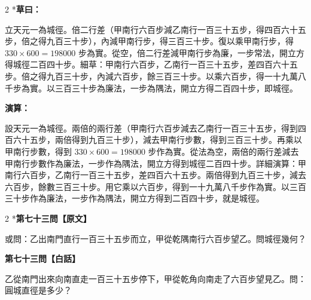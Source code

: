 \documentclass[11pt,a4paper]{article}
\begin{document}
\begin{paracol}{2}
\switchcolumn[0]*\textbf{草曰：}

\small 立天元一為城徑。倍二行差（甲南行六百步減乙南行一百三十五步，得四百六十五步，倍之得九百三十步），內減甲南行步，得三百三十步。復以乘甲南行步，得 $330 \times 600 = 198000$ 步為實。從空，倍二行差減甲南行步為廉，一步常法，開立方得城徑二百四十步。細草：甲南行六百步，乙南行一百三十五步，差四百六十五步。倍之得九百三十步，內減六百步，餘三百三十步。以乘六百步，得一十九萬八千步為實。以三百三十步為廉法，一步為隅法，開立方得二百四十步，即城徑。

\switchcolumn\textbf{演算：}

\small 設天元一為城徑。兩倍的兩行差（甲南行六百步減去乙南行一百三十五步，得到四百六十五步，兩倍得到九百三十步），減去甲南行步數，得到三百三十步。再乘以甲南行步數，得到 $330 \times 600 = 198000$ 步作為實。從法為空，兩倍的兩行差減去甲南行步數作為廉法，一步作為隅法，開立方得到城徑二百四十步。詳細演算：甲南行六百步，乙南行一百三十五步，差四百六十五步。兩倍得到九百三十步，減去六百步，餘數三百三十步。用它乘以六百步，得到一十九萬八千步作為實。以三百三十步作為廉法，一步作為隅法，開立方得到二百四十步，就是城徑。
\end{paracol}

\vspace{0.1cm}
\noindent{}
\par\vspace{0.3cm}

\begin{paracol}{2}
\switchcolumn[0]*\noindent\textbf{第七十三問【原文】}

\small 或問：乙出南門直行一百三十五步而立，甲從乾隅南行六百步望乙。問城徑幾何？

\switchcolumn\noindent\textbf{第七十三問【白話】}

\small 乙從南門出來向南直走一百三十五步停下，甲從乾角向南走了六百步望見乙。問：圓城直徑是多少？
\end{paracol}

\vspace{0.1cm}
\noindent{}
\par\vspace{0.15cm}
\end{document}
